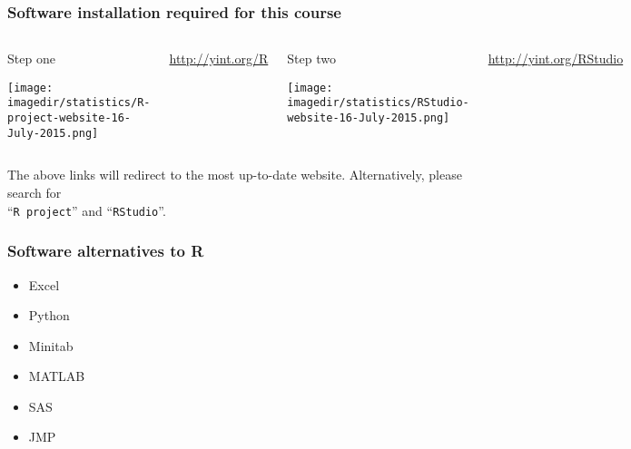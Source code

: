 \documentclass[handout,11pt,aspectratio=169,mathserif]{beamer}
\begin{document}
\begin{frame}\frametitle{Software installation required for this course}
	\begin{columns}[b]
			
			\begin{exampleblock}{\color{red}Step one}
				
				\vspace{10pt}
				\centerline{\texttt{[image: \\imagedir/statistics/R-project-website-16-July-2015.png]}}
			\end{exampleblock}
			
			\vfill
			
			\href{http://yint.org/R}{http://yint.org/R}
		
		
			\begin{exampleblock}{\color{red}Step two}
				\centerline{\texttt{[image: \\imagedir/statistics/RStudio-website-16-July-2015.png]}}
			\end{exampleblock}
			
			\vfill
			\href{http://yint.org/RStudio}{http://yint.org/RStudio}
	\end{columns}
	
	\vspace{6pt}
	\small
	The above links will redirect to the most up-to-date website. Alternatively, please search for\\ ``\texttt{R project}'' and ``\texttt{RStudio}''.
		
\end{frame}

\begin{frame}\frametitle{Software alternatives to R}

	\begin{itemize}
		\item	Excel
		\item	Python
		\item	Minitab
		\item	MATLAB
		\item	SAS
		\item	JMP
	\end{itemize}
\end{frame}

{
\begin{frame}\frametitle{}
\end{frame}}
\end{document}

